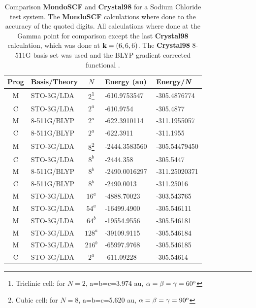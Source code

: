 \commentoutA{\documentclass[prb,aps,twocolumn,showpacs,twocolumngrid,superbib]{revtex4}}
\begin{document}
\begin{table}
\caption{Comparison \textbf{MondoSCF} and \textbf{Crystal98} for a 
Sodium Chloride test system. The \textbf{MondoSCF} calculations where done to
the accuracy of the quoted digits. All calculations where done at the Gamma point
for comparison except the last \textbf{Crystal98} calculation, which was done at ${\bf k}=(6,6,6)$.
The \textbf{Crystal98} 8-511G  basis set was used \cite{C98Basis} and the BLYP gradient corrected 
functional \cite{Becke93}.}
\label{table:ComToCrystal98_1}
 
\begin{tabular}{clcll}
\hline 
Prog&
Basis/Theory&
\( N \)&
Energy  (au)&
Energy/{\it N}\\
\hline
\hline 
M &
STO-3G/LDA&
2\footnote[1]{Triclinic cell: for $N=2$, a=b=c=3.974 au, $\alpha=\beta=\gamma=60^{{\rm o}}$}&
-610.9753547&
-305.4876774\\
C&
STO-3G/LDA&
$2^a$&
-610.9754&
-305.4877\\
M&
8-511G/BLYP&
$2^a$&
-622.3910114&
-311.1955057\\
C&
8-511G/BLYP&
$2^a$&
-622.3911&
-311.1955\\
\hline 
M&
STO-3G/LDA&
8\footnote[2]{Cubic cell: for $N=8$, a=b=c=5.620 au, $\alpha=\beta=\gamma=90^{{\rm o}}$}&
-2444.3583560&
-305.54479450\\
C&
STO-3G/LDA&
$8^b$&
-2444.358&
-305.5447\\
M&
8-511G/BLYP&
$8^b$&
-2490.0016297&
-311.25020371\\
C&
8-511G/BLYP&
$8^b$&
-2490.0013&
-311.25016 \\
\hline 
M&
STO-3G/LDA&
$16^a$&
-4888.70023&
-303.543765\\
M&
STO-3G/LDA&
$54^a$&
-16499.4900&
-305.546111\\
M&
STO-3G/LDA&
$64^b$&
-19554.9556&
-305.546181\\
M&
STO-3G/LDA&
$128^a$&
-39109.9115&
-305.546184\\
M&
STO-3G/LDA&
$216^b$ &
-65997.9768&
-305.546185\\
\hline
\,\,C\,\,&
STO-3G/LDA\,\,&
\,\,$2^a$\,\,&
-611.09228\,\,\,\,\,\,\,\,\,\,\,&
-305.54614\\
\hline
\end{tabular}
\end{table}
%
%
%
\end{document}
